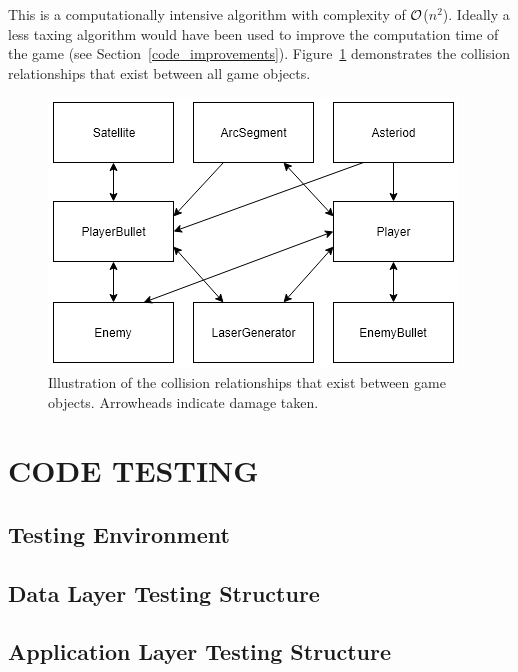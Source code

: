 \documentclass[10pt,twocolumn]{witseiepaper}
\begin{document}
This is a computationally intensive algorithm with complexity of $\cal{O}$($n^{2}$). Ideally a less taxing algorithm would have been used to improve the computation time of the game (see Section~\ref{code_improvements}). Figure~\ref{fig:collisions} demonstrates the collision relationships that exist between all game objects.

\begin{figure}[h]
	\centering
	\includegraphics[width=0.9\columnwidth]{collisions.png}
	\caption{Illustration of the collision relationships that exist between game objects. Arrowheads indicate damage taken.}
	\raggedright
	\label{fig:collisions}
\end{figure}


\section{CODE TESTING}

\subsection{Testing Environment}

\subsection{Data Layer Testing Structure}

\subsection{Application Layer Testing Structure}

\end{document}
